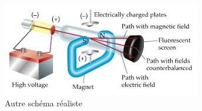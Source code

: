 \documentclass[../main.tex]{subfiles}
\begin{document}
\begin{figure}[h!]
    \centering
    \includegraphics[scale=0.9]{images/08.JJ-Thomson..jpg}
    \caption{Autre schéma réaliste}
    \label{fig:my_label}
\end{figure}

\begin{enumerate}
    
\end{enumerate}
\end{document}
